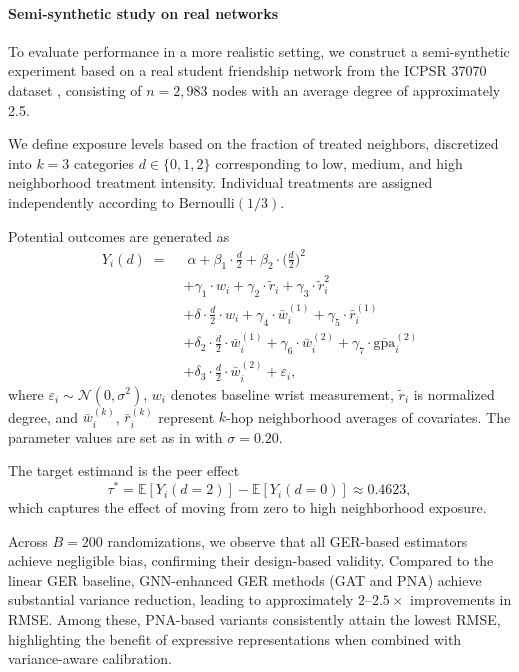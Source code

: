 \documentclass[twoside]{article}
\theoremstyle{plain}
\theoremstyle{definition}
\theoremstyle{remark}
\begin{document}
\paragraph{Semi-synthetic study on real networks}
To evaluate performance in a more realistic setting, we construct a semi-synthetic experiment based on a real student friendship network from the ICPSR 37070 dataset \citep{aronow2017estimating}, consisting of $n = 2{,}983$ nodes with an average degree of approximately 2.5.

We define exposure levels based on the fraction of treated neighbors, discretized into $k = 3$ categories $d \in \{0,1,2\}$ corresponding to low, medium, and high neighborhood treatment intensity. Individual treatments are assigned independently according to $\mathrm{Bernoulli}(1/3)$.

Potential outcomes are generated as
\begin{align*}
  Y_i(d) \;=\;& \;\alpha
     + \beta_1 \cdot \tfrac{d}{2}
     + \beta_2 \cdot \bigl(\tfrac{d}{2}\bigr)^2 \\
    &+ \gamma_1 \cdot w_i
     + \gamma_2 \cdot \tilde{r}_i
     + \gamma_3 \cdot \tilde{r}_i^2 \\
    &+ \delta \cdot \tfrac{d}{2} \cdot w_i + \gamma_4 \cdot \bar{w}_i^{(1)}
     + \gamma_5 \cdot \bar{r}_i^{(1)} \\
    &+ \delta_2 \cdot \tfrac{d}{2} \cdot \bar{w}_i^{(1)} + \gamma_6 \cdot \bar{w}_i^{(2)}
     + \gamma_7 \cdot \overline{\mathrm{gpa}}_i^{(2)} \\
    &+ \delta_3 \cdot \tfrac{d}{2} \cdot \bar{w}_i^{(2)}
     + \varepsilon_i,
\end{align*}
where $\varepsilon_i \sim \mathcal{N}(0, \sigma^2)$, $w_i$ denotes baseline wrist measurement, $\tilde{r}_i$ is normalized degree, and $\bar{w}_i^{(k)}$, $\bar{r}_i^{(k)}$ represent $k$-hop neighborhood averages of covariates. The parameter values are set as in with $\sigma = 0.20$.

The target estimand is the peer effect
\[
\tau^* = \mathbb{E}[Y_i(d{=}2)] - \mathbb{E}[Y_i(d{=}0)] \approx 0.4623,
\]
which captures the effect of moving from zero to high neighborhood exposure.

Across $B=200$ randomizations, we observe that all GER-based estimators achieve negligible bias, confirming their design-based validity. Compared to the linear GER baseline, GNN-enhanced GER methods (GAT and PNA) achieve substantial variance reduction, leading to approximately $2$--$2.5\times$ improvements in RMSE. Among these, PNA-based variants consistently attain the lowest RMSE, highlighting the benefit of expressive representations when combined with variance-aware calibration.
\end{document}
